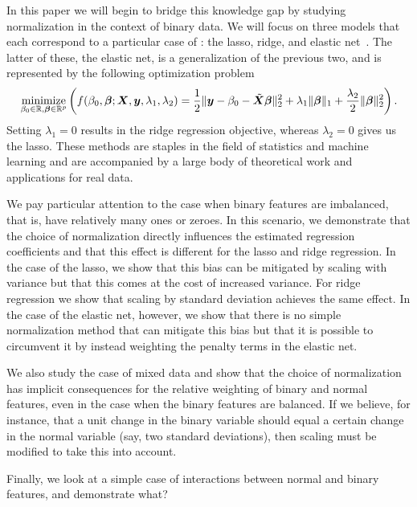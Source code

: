 In this paper we will begin to bridge this knowledge gap by studying normalization in the
context of binary data. We will focus on three models that each correspond to a particular
case of : the lasso, ridge, and elastic net~\citep{zou2005}. The
latter of these, the elastic net, is a generalization of the previous two, and is
represented by the following optimization problem
%
\begin{equation}
  \label{eq:elastic-net}
  \operatorname*{minimize}_{\beta_0 \in \mathbb{R},\boldsymbol{\beta} \in \mathbb{R}^p}\left( f(\beta_0, \boldsymbol{\beta};\boldsymbol{X},\boldsymbol{y},\lambda_1,\lambda_2)=\frac{1}{2} \lVert \boldsymbol y - \beta_0 - \tilde{\boldsymbol{X}}\boldsymbol{\beta} \rVert^2_2  + \lambda_1 \lVert \boldsymbol\beta \rVert_1 + \frac{\lambda_2}{2}\lVert \boldsymbol \beta \rVert_2^2\right).
\end{equation}
%
Setting \(\lambda_1 = 0\) results in the ridge regression objective, whereas \(\lambda_2 =
0\) gives us the lasso. These methods are staples in the field of statistics and machine
learning and are accompanied by a large body of theoretical work and applications for real
data.

We pay particular attention to the case when binary features are imbalanced, that is, have
relatively many ones or zeroes. In this scenario, we demonstrate that the choice of
normalization directly influences the estimated regression coefficients and that this
effect is different for the lasso and ridge regression. In the case of the lasso, we show
that this bias can be mitigated by scaling with variance but that this comes at the cost of
increased variance. For ridge regression we show that scaling by standard deviation
achieves the same effect. In the case of the elastic net, however, we show that there is no
simple normalization method that can mitigate this bias but that it is possible to
circumvent it by instead weighting the penalty terms in the elastic net.

We also study the case of mixed data and show that the choice of normalization has implicit
consequences for the relative weighting of binary and normal features, even in the case
when the binary features are balanced. If we believe, for instance, that a unit change in
the binary variable should equal a certain change in the normal variable (say, two standard
deviations), then scaling must be modified to take this into account.

Finally, we look at a simple case of interactions between normal and binary features, and
demonstrate what?

